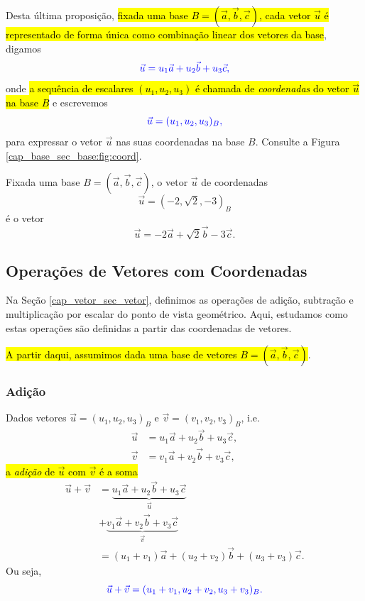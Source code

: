 Desta última proposição, \hl{fixada uma base $B = \left(\vec{a}, \vec{b}, \vec{c}\right)$, cada vetor $\vec{u}$ é representado de forma única como combinação linear dos vetores da base}, digamos
\begin{equation}\color{blue}\vec{u} = u_1\vec{a} + u_2\vec{b} + u_3\vec{c},
\end{equation}
onde \hl{a sequência de escalares $(u_1, u_2, u_3)$ é chamada de \emph{coordenadas} do vetor $\vec{u}$ na base $B$} e escrevemos
\begin{equation}\color{blue}\vec{u} = (u_1, u_2, u_3)_B,
\end{equation}
para expressar o vetor $\vec{u}$ nas suas coordenadas na base $B$. Consulte a Figura \ref{cap_base_sec_base:fig:coord}.

\begin{ex}
  Fixada uma base $B = (\vec{a}, \vec{b}, \vec{c})$, o vetor $\vec{u}$ de coordenadas 
  \begin{equation}
    \vec{u}=(-2,\sqrt{2},-3)_B
  \end{equation} 
  é o vetor 
  \begin{equation}
    \vec{u} = -2\vec{a} + \sqrt{2}\vec{b} - 3\vec{c}.
  \end{equation}
\end{ex}

\subsection{Operações de Vetores com Coordenadas}

Na Seção \ref{cap_vetor_sec_vetor}, definimos as operações de adição, subtração e multiplicação por escalar do ponto de vista geométrico. Aqui, estudamos como estas operações são definidas a partir das coordenadas de vetores.

\hl{A partir daqui, assumimos dada uma base de vetores $B = (\vec{a}, \vec{b}, \vec{c})$}.

\subsubsection{Adição}

Dados vetores $\vec{u} = (u_1, u_2, u_3)_B$ e $\vec{v} = (v_1, v_2, v_3)_B$, i.e.
\begin{align}
  \vec{u} &= u_1\vec{a} + u_2\vec{b} + u_3\vec{c},\\
  \vec{v} &= v_1\vec{a} + v_2\vec{b} + v_3\vec{c},
\end{align}
\hl{a \emph{adição} de $\vec{u}$ com $\vec{v}$ é a soma}
\begin{align}
  \vec{u}+\vec{v} &= \underbrace{u_1\vec{a} + u_2\vec{b} + u_3\vec{c}}_{\vec{u}}\nonumber\\ 
  &+ \underbrace{v_1\vec{a} + v_2\vec{b} + v_3\vec{c}}_{\vec{v}}\\
  &= (u_1+v_1)\vec{a} + (u_2+v_2)\vec{b} + (u_3+v_3)\vec{c}.
\end{align}
Ou seja,
\begin{equation}\color{blue}\vec{u}+\vec{v} = (u_1+v_1, u_2+v_2, u_3+v_3)_B.
\end{equation}

